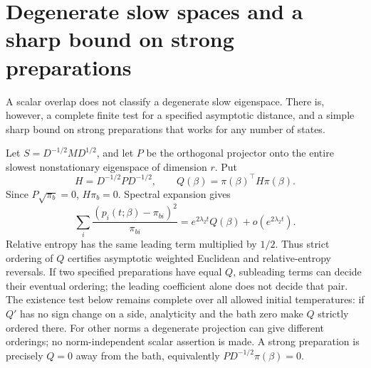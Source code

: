 \section{Degenerate slow spaces and a sharp bound on strong preparations}\label{sec:degenerateextension}
A scalar overlap does not classify a degenerate slow eigenspace. There is,
however, a complete finite test for a specified asymptotic distance, and a
simple sharp bound on strong preparations that works for any number of states.

Let $S=D^{-1/2}MD^{1/2}$, and let $P$ be the orthogonal projector onto the
entire slowest nonstationary eigenspace of dimension $r$. Put
\[
H=D^{-1/2}PD^{-1/2},\qquad
Q(\beta)=\pi(\beta)^\top H\pi(\beta).
\]
Since $P\sqrt{\pi_b}=0$, $H\pi_b=0$. Spectral expansion gives
\[
\sum_i\frac{(p_i(t;\beta)-\pi_{bi})^2}{\pi_{bi}}
=e^{2\lambda_2t}Q(\beta)+o(e^{2\lambda_2t}).
\]
Relative entropy has the same leading term multiplied by $1/2$. Thus strict
ordering of $Q$ certifies asymptotic weighted Euclidean and relative-entropy
reversals. If two specified preparations have equal $Q$, subleading terms can
decide their eventual ordering; the leading coefficient alone does not decide
that pair. The existence test below remains complete over all allowed initial
temperatures: if $Q'$ has no sign change on a side, analyticity and the bath
zero make $Q$ strictly ordered there. For other norms a degenerate projection can give different orderings;
no norm-independent scalar assertion is made. A strong preparation is precisely
$Q=0$ away from the bath, equivalently $PD^{-1/2}\pi(\beta)=0$.

